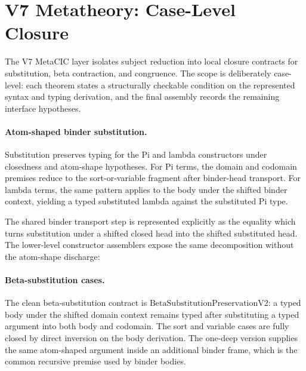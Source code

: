 \section*{V7 Metatheory: Case-Level Closure}\label{sec:self-comp-v7-metatheory}

The V7 MetaCIC layer isolates subject reduction into local closure contracts for
substitution, beta contraction, and congruence. The scope is deliberately
case-level: each theorem states a structurally checkable condition on the
represented syntax and typing derivation, and the final assembly records the
remaining interface hypotheses.

\paragraph{Atom-shaped binder substitution.}
Substitution preserves typing for the Pi and lambda constructors under
closedness and atom-shape hypotheses. For Pi terms, the domain and codomain
premises reduce to the sort-or-variable fragment after binder-head transport.
For lambda terms, the same pattern applies to the body under the shifted binder
context, yielding a typed substituted lambda against the substituted Pi type.

The shared binder transport step is represented explicitly as the equality
which turns substitution under a shifted closed head into the shifted
substituted head.
The lower-level constructor assemblers expose the same decomposition without
the atom-shape discharge:

\paragraph{Beta-substitution cases.}
The clean beta-substitution contract is
$\mathrm{BetaSubstitutionPreservationV2}$: a typed body under the shifted
domain context remains typed after substituting a typed argument into both body
and codomain. The sort and variable cases are fully closed by direct inversion
on the body derivation.
The one-deep version supplies the same atom-shaped argument inside an additional
binder frame, which is the common recursive premise used by binder bodies.

